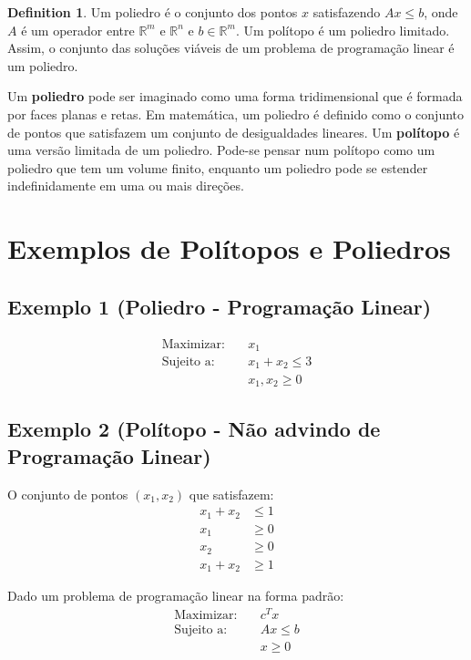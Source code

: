 \documentclass[]{article}
\theoremstyle{definition}
\newtheorem{definition}{Definition}[section]
\theoremstyle{definition}
\begin{document}
\begin{definition}
	 Um poliedro é o conjunto dos pontos $x$ satisfazendo $Ax \leq b$, onde $A$ é um operador entre $\mathbb{R}^m$ e $\mathbb{R}^n$ e $b \in \mathbb{R}^m$. Um polítopo é um poliedro limitado. Assim, o conjunto das soluções viáveis de um problema de programação linear é um poliedro. 
	
\end{definition}


Um \textbf{poliedro} pode ser imaginado como uma forma tridimensional que é formada por faces planas e retas. Em matemática, um poliedro é definido como o conjunto de pontos que satisfazem um conjunto de desigualdades lineares. Um \textbf{polítopo} é uma versão limitada de um poliedro. Pode-se pensar num polítopo como um poliedro que tem um volume finito, enquanto um poliedro pode se estender indefinidamente em uma ou mais direções.

\section*{Exemplos de Polítopos e Poliedros}

\subsection*{Exemplo 1 (Poliedro - Programação Linear)}
\begin{align}
\text{Maximizar:} \quad & x_1 \\
\text{Sujeito a:} \quad & x_1 + x_2 \leq 3 \\
& x_1, x_2 \geq 0
\end{align}

\subsection*{Exemplo 2 (Polítopo - Não advindo de Programação Linear)}
O conjunto de pontos \((x_1, x_2)\) que satisfazem:
\begin{align}
x_1 + x_2 & \leq 1 \\
x_1 &\geq 0 \\
x_2 &\geq 0 \\
x_1 + x_2 &\geq 1
\end{align}





Dado um problema de programação linear na forma padrão:
\begin{align*}
\text{Maximizar:} \quad & c^T x \\
\text{Sujeito a:} \quad & Ax \leq b \\
& x \geq 0 
\end{align*}
\end{document}
